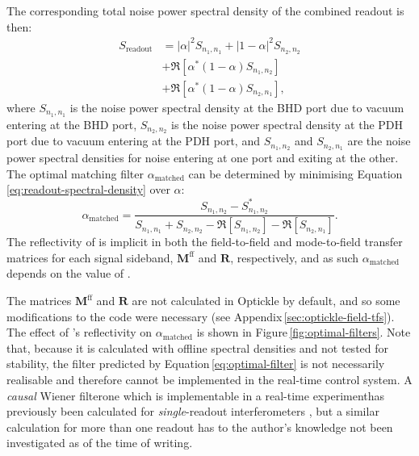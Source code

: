 The corresponding total noise power spectral density of the combined readout is then:
\begin{equation}
  \label{eq:readout-spectral-density}
  \begin{split}
    S_{\textrm{readout}} &= \left| \alpha \right|^{2} S_{n_{1},n_{1}} + \left| 1 - \alpha \right|^{2} S_{n_{2},n_{2}} \\
    &+ \Re \left[ \alpha^* \left(1 - \alpha \right) S_{n_{1},n_{2}} \right] \\
    &+ \Re \left[ \alpha^* \left(1 - \alpha \right) S_{n_{2},n_{1}} \right],
  \end{split}
\end{equation}
where $S_{n_{1},n_{1}}$ is the noise power spectral density at the \gls{BHD} port due to vacuum entering at the \gls{BHD} port, $S_{n_{2},n_{2}}$ is the noise power spectral density at the \gls{PDH} port due to vacuum entering at the \gls{PDH} port, and $S_{n_{1},n_{2}}$ and $S_{n_{2},n_{1}}$ are the noise power spectral densities for noise entering at one port and exiting at the other. The optimal matching filter $\alpha_{\textrm{matched}}$ can be determined by minimising Equation\,\ref{eq:readout-spectral-density} over $\alpha$:
\begin{equation}
  \label{eq:optimal-filter}
  \alpha_{\textrm{matched}} = \frac{S_{n_{1},n_{2}} - S^*_{n_{1},n_{2}}}{S_{n_{1},n_{1}} + S_{n_{2},n_{2}} - \Re \left[ S_{n_{1},n_{2}} \right] - \Re \left[ S_{n_{2},n_{1}} \right]}.
\end{equation}
The reflectivity of \MNINE{} is implicit in both the field-to-field and mode-to-field transfer matrices for each signal sideband, $\mathbf{M}^{\textrm{ff}}$ and $\mathbf{R}$, respectively, and as such $\alpha_{\textrm{matched}}$ depends on the value of \MNINE{}.

The matrices $\mathbf{M}^{\textrm{ff}}$ and $\mathbf{R}$ are not calculated in Optickle by default, and so some modifications to the code were necessary (see Appendix\,\ref{sec:optickle-field-tfs}). The effect of \MNINE{}'s reflectivity on $\alpha_{\textrm{matched}}$ is shown in Figure\,\ref{fig:optimal-filters}. Note that, because it is calculated with offline spectral densities and not tested for stability, the filter predicted by Equation\,\ref{eq:optimal-filter} is not necessarily realisable and therefore cannot be implemented in the real-time control system. A \emph{causal} Wiener filter\textemdash one which is implementable in a real-time experiment\textemdash has previously been calculated for \emph{single}-readout interferometers \cite{MuellerEbhardt2009, Miao2010}, but a similar calculation for more than one readout has to the author's knowledge not been investigated as of the time of writing.

